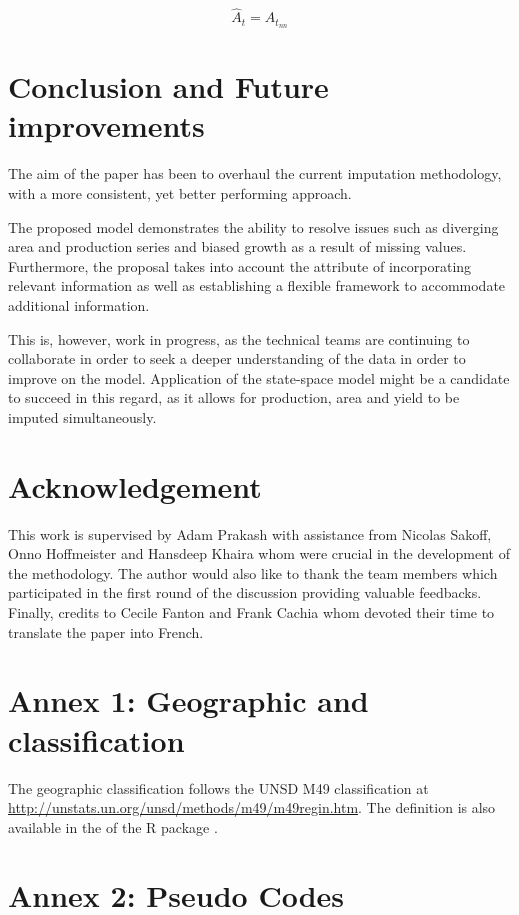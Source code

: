 \documentclass[nojss]{jss}\usepackage{graphicx, color}
\begin{document}
\begin{equation}
  \label{eq:locf}
  \hat{A}_t = A_{t_{nn}}
\end{equation}


\section{Conclusion and Future improvements}
The aim of the paper has been to overhaul the current imputation
methodology, with a more consistent, yet better performing approach.

The proposed model demonstrates the ability to resolve issues such as
diverging area and production series and biased growth as a result of
missing values. Furthermore, the proposal takes into account the
attribute of incorporating relevant information as well as
establishing a flexible framework to accommodate additional
information.

This is, however, work in progress, as the technical teams are
continuing to collaborate in order to seek a deeper understanding of
the data in order to improve on the model. Application of the
state-space model might be a candidate to succeed in this regard, as
it allows for production, area and yield to be imputed simultaneously.

\section{Acknowledgement}
This work is supervised by Adam Prakash with assistance from Nicolas
Sakoff, Onno Hoffmeister and Hansdeep Khaira whom were crucial in the
development of the methodology. The author would also like to thank
the team members which participated in the first round of the
discussion providing valuable feedbacks. Finally, credits to Cecile
Fanton and Frank Cachia whom devoted their time to translate the paper
into French.



\section*{Annex 1: Geographic and classification}

The geographic classification follows the UNSD M49 classification at
\url{http://unstats.un.org/unsd/methods/m49/m49regin.htm}. The
definition is also available in the  of the R
package .

\section*{Annex 2: Pseudo Codes}
\end{document}
